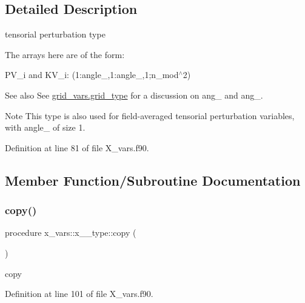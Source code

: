 \subsection{Detailed Description}
tensorial perturbation type 

The arrays here are of the form\+:
\begin{DoxyItemize}
\item {\ttfamily P\+V\+\_\+i} and K\+V\+\_\+i\+: {\ttfamily (1\+:angle\+\_,1\+:angle\+\_,1;n\+\_\+mod$^\wedge$2)}
\end{DoxyItemize}

\begin{DoxySeeAlso}{See also}
See \hyperlink{structgrid__vars_1_1grid__type}{grid\+\_\+vars.\+grid\+\_\+type} for a discussion on {\ttfamily ang\+\_} and {\ttfamily ang\+\_}.
\end{DoxySeeAlso}
\begin{DoxyNote}{Note}
This type is also used for field-\/averaged tensorial perturbation variables, with {\ttfamily angle\+\_} of size 1. 
\end{DoxyNote}


Definition at line 81 of file X\+\_\+vars.\+f90.



\subsection{Member Function/\+Subroutine Documentation}
\mbox{\label{structx__vars_1_1x__2__type_ae52df438c7be00a5cfe07c58ffe637d1}} 
\subsubsection{\texorpdfstring{copy()}{copy()}}
{\footnotesize\ttfamily procedure x\+\_\+vars\+::x\+\_\+\_\+type\+::copy (\begin{DoxyParamCaption}{ }\end{DoxyParamCaption})}



copy 



Definition at line 101 of file X\+\_\+vars.\+f90.

\mbox{\label{structx__vars_1_1x__2__type_a085972ba0d2b6930a028164cc42e1cec}} 
